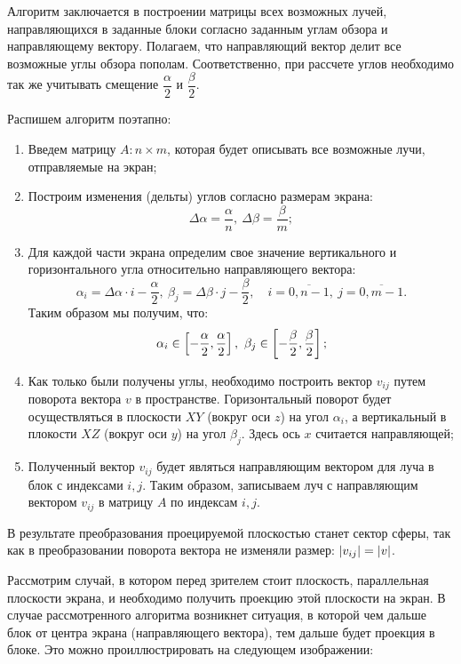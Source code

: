 	Алгоритм заключается в построении матрицы всех возможных лучей, направляющихся в заданные блоки согласно заданным углам обзора и направляющему вектору. Полагаем, что направляющий вектор делит все возможные углы обзора пополам. Соответственно, при рассчете углов необходимо так же учитывать смещение \( \dfrac{\alpha}{2} \) и \( \dfrac{\beta}{2} \).

	Распишем алгоритм поэтапно:
	\begin{enumerate}
		\item Введем матрицу \( A: n \times m \), которая будет описывать все возможные лучи, отправляемые на экран;
		\item Построим изменения (дельты) углов согласно размерам экрана:
		\[ \Delta\alpha = \frac{\alpha}{n}, ~ \Delta\beta = \frac{\beta}{m}; \]
		\item Для каждой части экрана определим свое значение вертикального и горизонтального угла относительно направляющего вектора:
		\[ \alpha_i = \Delta \alpha \cdot i - \frac{\alpha}{2}, ~ \beta_j = \Delta \beta \cdot j - \frac{\beta}{2}, \quad i = \overline{0, n - 1}, ~ j = \overline{0, m - 1}. \]
		Таким образом мы получим, что:
		\[ \alpha_i \in \left[ -\frac{\alpha}{2}, \frac{\alpha}{2} \right], ~ \beta_j \in \left[ -\frac{\beta}{2}, \frac{\beta}{2} \right]; \]
		\item Как только были получены углы, необходимо построить вектор \( v_{ij} \) путем поворота вектора $v$ в пространстве. Горизонтальный поворот будет осуществляться в плоскости \( XY \) (вокруг оси \( z \)) на угол \( \alpha_i \), а вертикальный в плокости \( XZ \) (вокруг оси \( y \)) на угол \( \beta_j \). Здесь ось $x$ считается направляющей; 
		\item Полученный вектор \( v_{ij} \) будет являться направляющим вектором для луча в блок с индексами \( i, j \). Таким образом, записываем луч с направляющим вектором \( v_{ij} \) в матрицу $A$ по индексам \( i, j \).
	\end{enumerate}

	В результате преобразования проецируемой плоскостью станет сектор сферы, так как в преобразовании поворота вектора не изменяли размер: \( \left\vert v_{ij} \right\vert = \left\vert v \right\vert \).

	Рассмотрим случай, в котором перед зрителем стоит плоскость, параллельная плоскости экрана, и необходимо получить проекцию этой плоскости на экран. В случае рассмотренного алгоритма возникнет ситуация, в которой чем дальше блок от центра экрана (направляющего вектора), тем дальше будет проекция в блоке. Это можно проиллюстрировать на следующем изображении:


